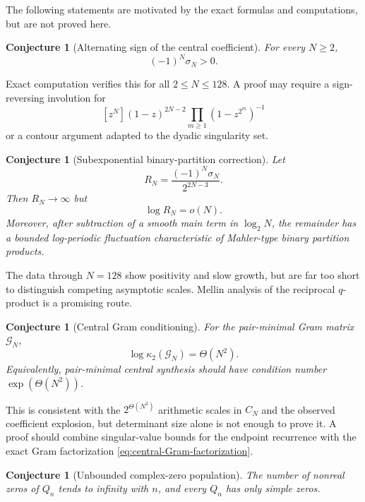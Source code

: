 \documentclass[11pt,oneside]{article}
\numberwithin{equation}{section}
\newtheorem{conjecture}[theorem]{Conjecture}
\theoremstyle{definition}
\theoremstyle{remark}
\begin{document}
The following statements are motivated by the exact formulas and computations,
but are not proved here.

\begin{conjecture}[Alternating sign of the central coefficient]
\label{conj:sigma-sign}
For every $N\ge2$,
\begin{equation}
 (-1)^N\sigma_N>0.
 \label{eq:sigma-sign-conj}
\end{equation}
\end{conjecture}

Exact computation verifies this for all $2\le N\le128$.  A proof may require
a sign-reversing involution for
\[
 [z^N](1-z)^{2N-2}\prod_{m\ge1}(1-z^{2^m})^{-1}
\]
or a contour argument adapted to the dyadic singularity set.

\begin{conjecture}[Subexponential binary-partition correction]
\label{conj:sigma-growth}
Let
\[
 R_N=\frac{(-1)^N\sigma_N}{2^{2N-3}}.
\]
Then $R_N\to\infty$ but
\begin{equation}
 \log R_N=o(N).
 \label{eq:sigma-subexp}
\end{equation}
Moreover, after subtraction of a smooth main term in $\log_2N$, the remainder
has a bounded log-periodic fluctuation characteristic of Mahler-type binary
partition products.
\end{conjecture}

The data through $N=128$ show positivity and slow growth, but are far too short
to distinguish competing asymptotic scales.  Mellin analysis of the reciprocal
$q$-product is a promising route.

\begin{conjecture}[Central Gram conditioning]
\label{conj:conditioning}
For the pair-minimal Gram matrix $\mathcal G_N$,
\begin{equation}
 \log\kappa_2(\mathcal G_N)=\Theta(N^2).
 \label{eq:conditioning-conj}
\end{equation}
Equivalently, pair-minimal central synthesis should have condition number
$\exp(\Theta(N^2))$.
\end{conjecture}

This is consistent with the $2^{\Theta(N^2)}$ arithmetic scales in
$C_N$ and the observed coefficient explosion, but determinant size alone is
not enough to prove it.  A proof should combine singular-value bounds for the
endpoint recurrence with the exact Gram factorization
\eqref{eq:central-Gram-factorization}.

\begin{conjecture}[Unbounded complex-zero population]
\label{conj:complex-zeros}
The number of nonreal zeros of $Q_n$ tends to infinity with $n$, and every
$Q_n$ has only simple zeros.
\end{conjecture}
\end{document}
